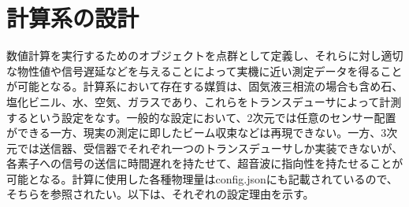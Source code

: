 \documentclass[uplatex]{suribt}
\begin{document}
\section{計算系の設計}
数値計算を実行するためのオブジェクトを点群として定義し、それらに対し適切な物性値や信号遅延などを与えることによって実機に近い測定データを得ることが可能となる。計算系において存在する媒質は、固気液三相流の場合も含め石、塩化ビニル、水、空気、ガラスであり、これらをトランスデューサによって計測するという設定をなす。一般的な設定において、2次元では任意のセンサー配置ができる一方、現実の測定に即したビーム収束などは再現できない。一方、3次元では送信器、受信器でそれぞれ一つのトランスデューサしか実装できないが、各素子への信号の送信に時間遅れを持たせて、超音波に指向性を持たせることが可能となる。計算に使用した各種物理量はconfig.jsonにも記載されているので、そちらを参照されたい。以下は、それぞれの設定理由を示す。
\end{document}

